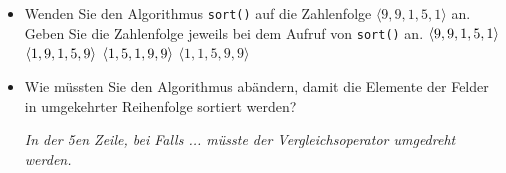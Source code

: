 \documentclass[a4paper, 12pt]{article}
\begin{document}
\begin{angabe}
\begin{minipage}{6.5cm}
\begin{itemize}
\begin{tabular}{ c c c c c}
\end{tabular}

\item
Wenden Sie den Algorithmus \texttt{sort()} auf die Zahlenfolge 
$\langle 9, 9, 1, 5, 1\rangle$ an. Geben Sie die Zahlenfolge jeweils bei
dem Aufruf von \texttt{sort()} an.
\newline
$\langle 9, 9, 1, 5, 1\rangle\newline $
$\langle 1,9,1,5,9\rangle\newline$
$\langle 1,5,1,9,9\rangle\newline$
$\langle 1,1,5,9,9\rangle$
\item
Wie müssten Sie den Algorithmus abändern, damit die Elemente der
Felder in umgekehrter Reihenfolge sortiert werden?

\textit{In der 5en Zeile, bei Falls ... müsste der Vergleichsoperator umgedreht werden.	
}\end{itemize} 
\end{minipage}
\end{angabe}
\end{document}
